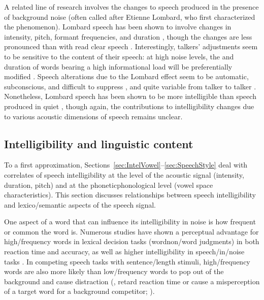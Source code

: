 A related line of research involves the changes to speech produced in the presence of background noise (often called  after Etienne Lombard, who first characterized the phenomenon).  Lombard speech has been shown to involve changes in intensity, pitch, formant frequencies, and duration \citep{LaneTranel1971, SummersEtAl1988}, though the changes are less pronounced than with read clear speech \citep{HazanBaker2011}.  Interestingly, talkers’ adjustments seem to be sensitive to the content of their speech: at high noise levels, the \fo{} and duration of words bearing a high informational load will be preferentially modified \citep{PatelSchell2008}.  Speech alterations due to the Lombard effect seem to be automatic, subconscious, and difficult to suppress \citep{PickEtAl1989}, and quite variable from talker to talker \citep{Junqua1993}.  Nonetheless, Lombard speech has been shown to be more intelligible than speech produced in quiet \citep{DreherONeill1957, SummersEtAl1988}, though again, the contributions to intelligibility changes due to various acoustic dimensions of speech remains unclear.


\subsection{Intelligibility and linguistic content\label{sec:IntelLingContent}}
To a first approximation, Sections~\ref{sec:IntelVowel}–\ref{sec:SpeechStyle} deal with correlates of speech intelligibility at the level of the acoustic signal (intensity, duration, pitch) and at the phonetic\slsh phonological level (vowel space characteristics).  This section discusses relationships between speech intelligibility and lexico\-/semantic aspects of the speech signal.

One aspect of a word that can influence its intelligibility in noise is how frequent or common the word is.  Numerous studies have shown a perceptual advantage for high\-/frequency words in lexical decision tasks (word\slsh non\-/word judgments) in both reaction time and accuracy, as well as higher intelligibility in speech\-/in\-/noise tasks \citep[\eg,][]{Howes1957, Savin1963, VitevitchLuce1998, DirksEtAl2001, TakayanagiEtAl2002, VitevitchRodriguez2005}.  In competing speech tasks with sentence\-/length stimuli, high\-/frequency words are also more likely than low\-/frequency words to pop out of the background and cause distraction (\ie, retard reaction time or cause a misperception of a target word for a background competitor; \citealt{BoulengerEtAl2010}).

